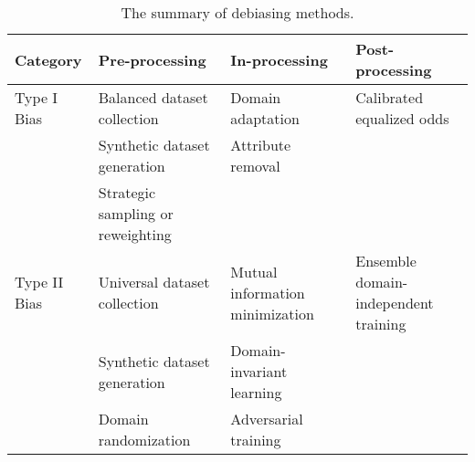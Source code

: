 \begin{table*}[htbp]
\centering
   \caption{The summary of debiasing methods.}
\label{tab:debiasing_methods}


\begin{tabular}{llll}
\toprule
Category     & Pre-processing                                                                                           & In-processing                                                                & Post-processing                                   \\
\midrule
Type I Bias  & Balanced dataset collection~\cite{Timnit_sex_classification_PPB,Fairface}                                & Domain adaptation~\cite{RFW_IMAN,MFR,BAE}                                    & Calibrated equalized odds~\cite{calibrated_Eodds} \\
             & Synthetic dataset generation~\cite{transect, CAT}                                                        & Attribute removal~\cite{DebFace,pass}                                        &                                                   \\
             & Strategic sampling or reweighting~\cite{RL_RBN}                                                                         &                                                                              &                                                   \\
             \midrule
Type II Bias & Universal dataset collection~\cite{extreme_bias} & Mutual information minimization~\cite{learn_not_to_learn_Colored_MNIST,Back_MI,CSAD} & Ensemble domain-independent training~\cite{DI}    \\
             & Synthetic dataset generation~\cite{DP_difference_fpr_GAN_debiasing,fairnessgan_DP_difference_error_rate} & Domain-invariant learning~\cite{Group_DRO, PGI_invariant, EIIL} &                                                  \\
                                                                & Domain randomization~\cite{domain_randomization} & Adversarial training~\cite{LfF_CelebA_Bias_conflicting,BlindEye_IMDB_eb,gradient_projection} & \\
             \bottomrule
\end{tabular}
\end{table*}
